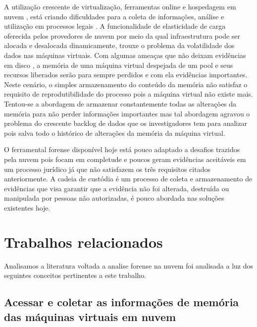 \documentclass[conference]{IEEEtran}
\newcommand{\marcos}[1]{{\color{blue}{MARCOS: #1}}}
\begin{document}
\marcos{Mas de novo? Esse texto traz alguma coisa de novidade com relação à introdução?}
A utilização crescente de virtualização, ferramentas online e hospedagem em nuvem \cite{Amazon2016}, está criando dificuldades para a coleta de informações, análise e utilização em processos legais \cite{Sharma2012}. 
%
A funcionalidade de elasticidade de carga oferecida pelos provedores de nuvem por meio da qual infraestrutura pode ser alocada e desalocada dinamicamente, trouxe o problema da volatilidade dos dados nas máquinas virtuais. 
%
Com algumas ameaças que não deixam evidências em disco \cite{Rafique2013}, a memória de uma máquina virtual despejada de um pool e seus recursos liberados serão para sempre perdidos e com ela evidências importantes. 
%
Neste cenário, o simples armazenamento do conteúdo da memória não satisfaz o requisito de reprodutibilidade do processo pois a máquina virtual não existe mais. 
%
Tentou-se a abordagem de armazenar constantemente todas as alterações da memória para não perder informações importantes mas tal abordagem agravou o problema do crescente backlog de dados que os investigadores tem para analizar \cite{Quick2014} pois salva todo o histórico de alterações da memória da máquina virtual.

O ferramental forense disponível hoje está pouco adaptado a desafios trazidos pela nuvem \cite{Dykstra2012a} pois focam em completude e poucos geram evidências aceitáveis em um processo jurídico \cite{Reichert2015} já que não satisfazem os três requisitos citados anteriormente. 
%
A cadeia de custódia é um processo de coleta e armazenamento de evidências que visa garantir que a evidência não foi alterada, destruída ou manipulada por pessoas não autorizadas, é pouco abordada nas soluções existentes hoje.

\section{Trabalhos relacionados}
\label{sec:related}

Analisamos a literatura voltada a analise forense na nuvem foi analisada a luz dos seguintes conceitos pertinentes a este trabalho. 

\subsection{Acessar e coletar as informações de memória das máquinas virtuais em nuvem}
\end{document}
